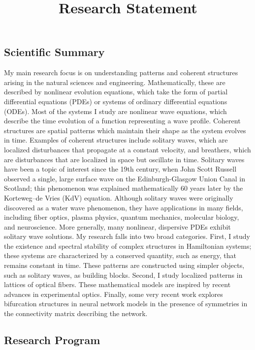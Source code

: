 \documentclass[11pt,reqno,oneside]{article}
\title{Research Statement}
\date{\vspace{-12ex}}
\theoremstyle{definition}
\theoremstyle{remark}
\begin{document}
\thispagestyle{empty}


\subsection*{Scientific Summary}

My main research focus is on understanding patterns and coherent structures arising in the natural sciences and engineering. Mathematically, these are described by nonlinear evolution equations, which take the form of partial differential equations (PDEs) or systems of ordinary differential equations (ODEs). Most of the systems I study are nonlinear wave equations, which describe the time evolution of a function representing a wave profile. Coherent structures are spatial patterns which maintain their shape as the system evolves in time. Examples of coherent structures include solitary waves, which are localized disturbances that propagate at a constant velocity, and breathers, which are disturbances that are localized in space but oscillate in time. 
Solitary waves have been a topic of interest since the 19th century, when John Scott Russell observed a single, large surface wave on the Edinburgh-Glasgow Union Canal in Scotland; this phenomenon was explained mathematically 60 years later by the Korteweg–de Vries (KdV) equation.
Although solitary waves were originally discovered as a water wave phenomenon, they have applications in many fields, including fiber optics, plasma physics, quantum mechanics, molecular biology, and neuroscience. More generally, many nonlinear, dispersive PDEs exhibit solitary wave solutions. My research falls into two broad categories. First, I study the existence and spectral stability of complex structures in Hamiltonian systems; these systems are characterized by a conserved quantity, such as energy, that remains constant in time. These patterns are constructed using simpler objects, such as solitary waves, as building blocks. 
Second, I study localized patterns in lattices of optical fibers. These mathematical models are inspired by recent advances in experimental optics. Finally, some very recent work explores bifurcation structures in neural network models in the presence of symmetries in the connectivity matrix describing the network.

\subsection*{Research Program}
\end{document}
